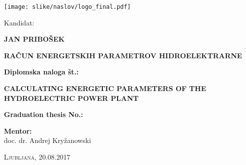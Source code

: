 \thispagestyle{empty}

\begin{minipage}{\textwidth}

\begin{center}

\vspace*{-3cm}


\begin{center}
\advance\leftskip-2cm
\texttt{[image: slike/naslov/logo\_final.pdf]}
\end{center}





Kandidat:\\
\vspace*{0.5cm}
\begin{Large}
\textbf{JAN PRIBOŠEK}
\end{Large}

\vspace*{2cm}

\begin{Large}
\textbf{RAČUN ENERGETSKIH PARAMETROV HIDROELEKTRARNE}
\end{Large}

\vspace*{0.5cm}

\begin{large}
\textbf{Diplomska naloga št.:}
\end{large}

\vspace*{1.5cm}

\begin{Large}
	\textbf{CALCULATING ENERGETIC PARAMETERS OF THE HYDROELECTRIC POWER PLANT}
\end{Large}

\vspace*{0.5cm}

\begin{large}
	\textbf{Graduation thesis No.:}
\end{large}



\end{center}
\vspace*{8cm}


\begin{large}
	\textbf{Mentor:}\\
	doc. dr. Andrej Kryžanowski \\
\end{large}

\begin{center}
\textsc{Ljubljana, 20.08.2017}
\end{center}

\end{minipage}

\newpage
\thispagestyle{empty}
\cleardoublepage